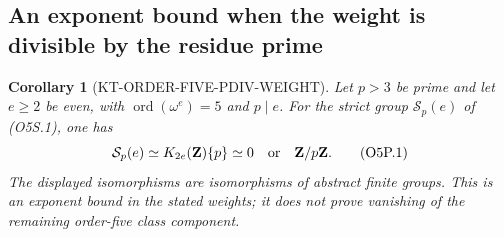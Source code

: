 \documentclass[11pt,a4paper]{article}
\newtheorem{corollary}[theorem]{Corollary}
\theoremstyle{definition}
\begin{document}


\subsection{An exponent bound when the weight is divisible by the residue prime}

\begin{corollary}[KT-ORDER-FIVE-PDIV-WEIGHT]
Let $p>3$ be prime and let $e\ge2$ be even, with
$\operatorname{ord}(\omega^e)=5$ and $p\mid e$.
For the strict group $\mathcal S_p(e)$ of (O5S.1), one has
\[
 \mathcal S_p(e)\simeq K_{2e}(\mathbf Z)\{p\}
       \simeq0\quad\hbox{or}\quad\mathbf Z/p\mathbf Z.
                                                        \tag{O5P.1}
\]
The displayed isomorphisms are isomorphisms of abstract finite groups.
This is an exponent bound in the stated weights; it does not prove
vanishing of the remaining order-five class component.
\end{corollary}
\end{document}
